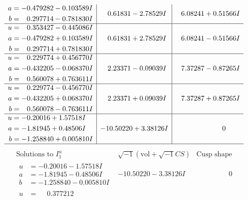 \documentclass[1p]{elsarticle_modified}
\theoremstyle{definition}
\newcommand{\I}{\sqrt{-1}}
\begin{document}
$$\begin{array}{c|c|c}
\begin{aligned}
a &= -0.479282 - 0.103589 I \\
b &= \phantom{-}0.297714 - 0.781830 I\end{aligned}
 & \phantom{-}0.61831 - 2.78529 I & \phantom{-}6.08241 + 0.51566 I \\ \hline\begin{aligned}
u &= \phantom{-}0.353427 - 0.445086 I \\
a &= -0.479282 + 0.103589 I \\
b &= \phantom{-}0.297714 + 0.781830 I\end{aligned}
 & \phantom{-}0.61831 + 2.78529 I & \phantom{-}6.08241 - 0.51566 I \\ \hline\begin{aligned}
u &= \phantom{-}0.229774 + 0.456770 I \\
a &= -0.432205 - 0.068370 I \\
b &= \phantom{-}0.560078 + 0.763611 I\end{aligned}
 & \phantom{-}2.23371 - 0.09039 I & \phantom{-}7.37287 - 0.87265 I \\ \hline\begin{aligned}
u &= \phantom{-}0.229774 - 0.456770 I \\
a &= -0.432205 + 0.068370 I \\
b &= \phantom{-}0.560078 - 0.763611 I\end{aligned}
 & \phantom{-}2.23371 + 0.09039 I & \phantom{-}7.37287 + 0.87265 I \\ \hline\begin{aligned}
u &= -0.20016 + 1.57518 I \\
a &= -1.81945 + 0.48506 I \\
b &= -1.258840 + 0.005810 I\end{aligned}
 & -10.50220 + 3.38126 I & \phantom{-0.000000 } 0\\
 \hline 
 \end{array}$$\newpage$$\begin{array}{c|c|c}  
\text{Solutions to }I^u_{1}& \I (\text{vol} + \sqrt{-1}CS) & \text{Cusp shape}\\
 \hline 
\begin{aligned}
u &= -0.20016 - 1.57518 I \\
a &= -1.81945 - 0.48506 I \\
b &= -1.258840 - 0.005810 I\end{aligned}
 & -10.50220 - 3.38126 I & \phantom{-0.000000 } 0 \\ \hline\begin{aligned}
u &= \phantom{-}0.377212\phantom{ +0.000000I} \\

\end{aligned}
\end{array}$$
\end{document}
